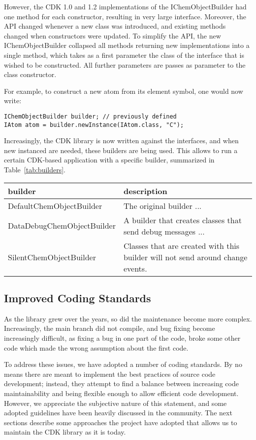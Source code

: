 \documentclass[10pt]{bmc_article}
\newenvironment{bmcformat}{\begin{raggedright}\baselineskip20pt\sloppy\setboolean{publ}{false}}{\end{raggedright}\baselineskip20pt\sloppy}
\begin{document}
\begin{bmcformat}
However, the CDK 1.0 and 1.2 implementations of the IChemObjectBuilder had one method for
each constructor, resulting in very large interface. Moreover, the API changed whenever
a new class was introduced, and existing methods changed when constructors were updated.
To simplify the API, the new IChemObjectBuilder collapsed all methods returning new
implementations into a single method, which takes as a first parameter the class of the
interface that is wished to be constructed. All further parameters are passes as
parameter to the class constructor.

For example, to construct a new atom from its element symbol, one would now write:

\begin{verbatim}
IChemObjectBuilder builder; // previously defined
IAtom atom = builder.newInstance(IAtom.class, "C");
\end{verbatim}

Increasingly, the CDK library is now written against the interfaces, and when new instanced
are needed, these builders are being used. This allows to run a certain CDK-based
application with a specific builder, summarized in Table~\ref{tab:builders}.

\begin{table}
\begin{tabular}{l|l}
builder & description \\
\hline
DefaultChemObjectBuilder & The original builder ... \\
DataDebugChemObjectBuilder & A builder that creates classes that send debug messages ... \\
SilentChemObjectBuilder & Classes that are created with this builder will not
    send around change events. \\
\end{tabular}
\end{table}

\subsection*{Improved Coding Standards}

As the library grew over the years, so did the maintenance become more complex. Increasingly,
the main branch did not compile, and bug fixing become increasingly difficult, as fixing a bug
in one part of the code, broke some other code which made the wrong assumption about the first
code.

To address these issues, we have adopted a number of coding standards. By no means there are
meant to implement the best practices of source code development; instead, they attempt to find
a balance between increasing code maintainability and being flexible enough to allow efficient
code development. However, we appreciate the subjective nature of this statement, and some
adopted guidelines have been heavily discussed in the community.
The next sections describe some approaches the project have adopted that allows us to
maintain the CDK library as it is today. 


\end{bmcformat}
\end{document}
